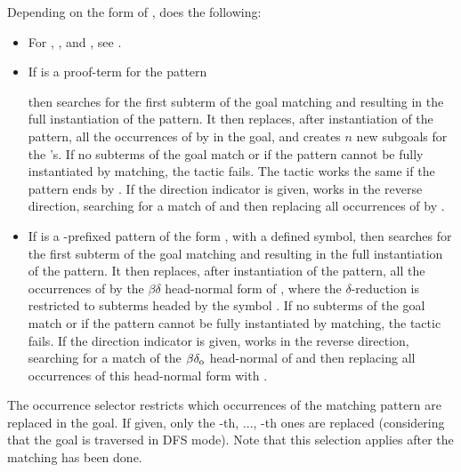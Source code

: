 Depending on the form of , \tacname{}  does the following:
  \begin{itemize}
   \item For \ec{//}, \ec{/=}, and \ec{//=}, see .
   \item If  is a proof-term for the pattern
     \begin{center}
     \end{center}
     \noindent then \tacname{} searches for the first subterm of the goal
     matching  and resulting in the full instantiation of the pattern.
     It then replaces, after instantiation of the pattern, all the occurrences
     of  by  in the goal, and creates $n$ new subgoals for the
     's. If no subterms of the goal match  or if the pattern
     cannot be fully instantiated by matching, the tactic fails.
     The tactic works the same if the pattern ends by . If the
     direction indicator \ec{-} is given, \tacname{} works in the reverse
     direction, searching for a match of  and then replacing all
     occurrences of  by .
   \item If  is a \ec{/}-prefixed pattern of the form ,
     with  a defined symbol, then \tacname{} searches for the first subterm
     of the goal matching  and resulting in the full instantiation
     of the pattern. It then replaces, after instantiation of the pattern, all
     the occurrences of  by the $\beta\delta$ head-normal form
     of , where the $\delta$-reduction is restricted to subterms
     headed by the symbol . If no subterms of the goal match  or
     if the pattern cannot be fully instantiated by matching, the tactic fails. If the
     direction indicator \ec{-} is given, \tacname{} works in the reverse
     direction, searching for a match of the $\beta\delta_{\rm o}$ head-normal
     of  and then replacing all occurrences of this head-normal
     form with .
  \end{itemize}
  
  \smallskip
  
  The occurrence selector  restricts which occurrences
  of the matching pattern are replaced in the goal. If given, only the
  -th, ..., -th ones are replaced (considering that the goal is
  traversed in DFS mode). Note that this selection applies after the matching has
  been done.
  
